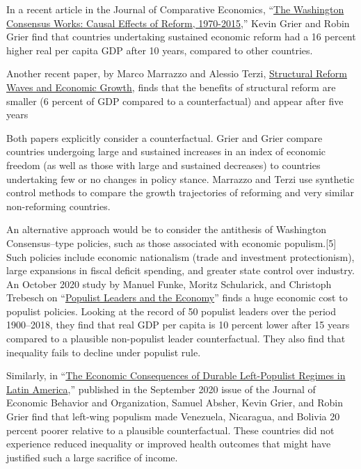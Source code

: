 \documentclass[
]{book}
\begin{document}
In a recent article in the Journal of Comparative Economics, ``\href{https://www.sciencedirect.com/science/article/pii/S0147596720300639}{The Washington Consensus Works: Causal Effects of Reform, 1970-2015},'' Kevin Grier and Robin Grier find that countries undertaking sustained economic reform had a 16 percent higher real per capita GDP after 10 years, compared to other countries.

Another recent paper, by Marco Marrazzo and Alessio Terzi, \href{https://papers.ssrn.com/sol3/papers.cfm?abstract_id=3071545}{Structural Reform Waves and Economic Growth}, finds that the benefits of structural reform are smaller (6 percent of GDP compared to a counterfactual) and appear after five years

Both papers explicitly consider a counterfactual. Grier and Grier compare countries undergoing large and sustained increases in an index of economic freedom (as well as those with large and sustained decreases) to countries undertaking few or no changes in policy stance. Marrazzo and Terzi use synthetic control methods to compare the growth trajectories of reforming and very similar non-reforming countries.

An alternative approach would be to consider the antithesis of Washington Consensus--type policies, such as those associated with economic populism.{[}5{]} Such policies include economic nationalism (trade and investment protectionism), large expansions in fiscal deficit spending, and greater state control over industry. An October 2020 study by Manuel Funke, Moritz Schularick, and Christoph Trebesch on ``\href{https://t.co/R5qYmjA3I8?amp=1}{Populist Leaders and the Economy}'' finds a huge economic cost to populist policies.
Looking at the record of 50 populist leaders over the period 1900--2018, they find that real GDP per capita is 10 percent lower after 15 years compared to a plausible non-populist leader counterfactual. They also find that inequality fails to decline under populist rule.

Similarly, in ``\href{https://www.sciencedirect.com/science/article/pii/S0167268120302237}{The Economic Consequences of Durable Left-Populist Regimes in Latin America},'' published in the September 2020 issue of the Journal of Economic Behavior and Organization, Samuel Absher, Kevin Grier, and Robin Grier find that left-wing populism made Venezuela, Nicaragua, and Bolivia 20 percent poorer relative to a plausible counterfactual. These countries did not experience reduced inequality or improved health outcomes that might have justified such a large sacrifice of income.
\end{document}
